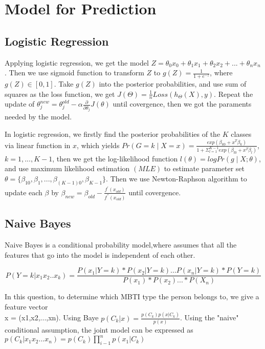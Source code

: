 \documentclass{article}
\begin{document}
\section{Model for Prediction}
\subsection{Logistic Regression}

Applying logistic regression, we get the model $Z = \theta_0 x_0 + \theta_1 x_1 +\theta_2 x_2 + ... +\theta_n x_n$. Then we use sigmoid function to transform $Z$ to $g\left( Z\right)  = \frac{1}{1+ e^{-z}}$, where $g(Z)  \in \left[0,1\right]$. Take $g(Z)$ into  the posterior probabilities, and use sum of squares as the loss function, we get $J\left( \Theta\right) = \frac{1}{n} Loss\left( h_\Theta\left( X\right), y \right) $. Repeat the update of $\theta_j^{new} = \theta_j^{old} - \alpha \frac{\partial}{\partial \theta_j}J\left( \theta\right) $ until covergence, then we got the paraments needed by the model.

In logistic regression, we firstly find the posterior probabilities of the $K$ classes via linear function in $x$, which yields $Pr\left(G = k\mid X = x\right) = \frac{exp\left(\beta_{k0}+x^{T} \beta_{k}\right)}{1+\Sigma_{l=1}^{K-1}exp\left(\beta_{l0}+x^{T} \beta_{l}\right)}$, $k = 1,...,K-1$, then we get the log-likelihood function $l(\theta) = logPr\left(g\mid X; \theta\right) $, and use maximum likelihood estimation $\left(MLE\right)$ to estimate parameter set $\theta = \{\beta_{10},\beta_1,...,\beta_{\left(K-1\right)0},\beta_{K-1} \}$. Then we use Newton-Raphson algorithm to update each $\beta$ by $\beta_{new} = \beta_{old} - \frac{f^{'}\left(x_{old}\right)}{f^{''}\left(x_{old}\right)}$ until covergence.

\subsection{Naive Bayes}
Naive Bayes is a conditional probability model,where  assumes that all the features that go into the model is independent of each other.

$$ P(Y= k|x_1x_2..x_k)= \frac{P(x_1|Y=k)*P(x_2|Y=k)...P(x_n|Y=k)*P(Y = k) }{ P(x_1)*P(x_2)...* P(X_n)}$$

In this question, to determine which MBTI type the person belongs to, we give a feature vector\\ x = (x1,x2,...,xn). Using Baye $ p(C_k|x) = \frac{p(C_k)p(x|C_k)}{p(x)} $. Using the "naive" conditional assumption, the joint model can be expressed as $p(C_k|x_1x_2...x_n) = p(C_k)\prod_{i-1}^n p(x_1|C_k)$ 
\end{document}
